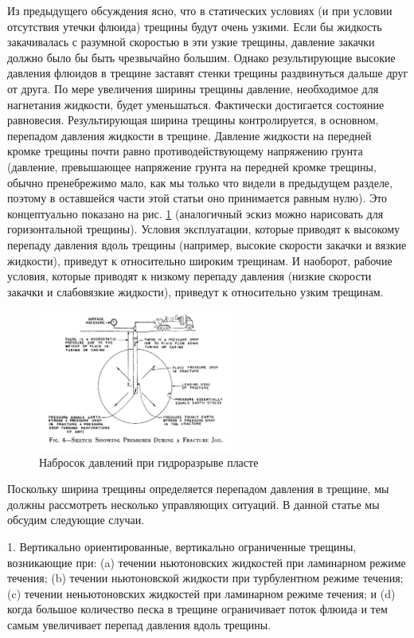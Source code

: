 \documentclass[a4paper, 12pt]{article}
\begin{document}
Из предыдущего обсуждения ясно, что в статических условиях (и при условии отсутствия утечки флюида) трещины будут очень узкими.
Если бы жидкость закачивалась с разумной скоростью в эти узкие трещины, давление закачки должно было бы быть чрезвычайно большим.
Однако результирующие высокие давления флюидов в трещине заставят стенки трещины раздвинуться дальше друг от друга.
По мере увеличения ширины трещины давление, необходимое для нагнетания жидкости, будет уменьшаться.
Фактически достигается состояние равновесия.
Результирующая ширина трещины контролируется, в основном, перепадом давления жидкости в трещине.
Давление жидкости на передней кромке трещины почти равно противодействующему напряжению грунта (давление, превышающее напряжение грунта на передней кромке трещины, обычно пренебрежимо мало, как мы только что видели в предыдущем разделе, поэтому в оставшейся части этой статьи оно принимается равным нулю).
Это концептуально показано на рис. \ref{fig:Perkins4} (аналогичный эскиз можно нарисовать для горизонтальной трещины).
Условия эксплуатации, которые приводят к высокому перепаду давления вдоль трещины (например, высокие скорости закачки и вязкие жидкости), приведут к относительно широким трещинам.
И наоборот, рабочие условия, которые приводят к низкому перепаду давления (низкие скорости закачки и слабовязкие жидкости), приведут к относительно узким трещинам.

\begin{figure}[H]
\center
\includegraphics[width=0.57\textwidth]{Perkins_4}
\caption{Набросок давлений при гидроразрыве пласте}
\label{fig:Perkins4}
\end{figure}

Поскольку ширина трещины определяется перепадом давления в трещине, мы должны рассмотреть несколько управляющих ситуаций.
В данной статье мы обсудим следующие случаи.

1. Вертикально ориентированные, вертикально ограниченные трещины, возникающие при:
(a) течении ньютоновских жидкостей при ламинарном режиме течения;
(b) течении ньютоновской жидкости при турбулентном режиме течения; 
(c) течении неньютоновских жидкостей при ламинарном режиме течения;
и (d) когда большое количество песка в трещине ограничивает поток флюида и тем самым увеличивает перепад давления вдоль трещины.
\end{document}
